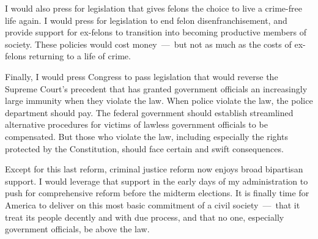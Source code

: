 I would also press for legislation that gives felons the choice to live a crime-free life again. I would press for legislation to end felon disenfranchisement, and provide support for ex-felons to transition into becoming productive members of society. These policies would cost money~---~but not as much as the costs of ex-felons returning to a life of crime.

Finally, I would press Congress to pass legislation that would reverse the Supreme Court's precedent that has granted government officials an increasingly large immunity when they violate the law. When police violate the law, the police department should pay. The federal government should establish streamlined alternative procedures for victims of lawless government officials to be compensated. But those who violate the law, including especially the rights protected by the Constitution, should face certain and swift consequences.

Except for this last reform, criminal justice reform now enjoys broad bipartisan support. I would leverage that support in the early days of my administration to push for comprehensive reform before the midterm elections. It is finally time for America to deliver on this most basic commitment of a civil society~---~that it treat its people decently and with due process, and that no one, especially government officials, be above the law.
